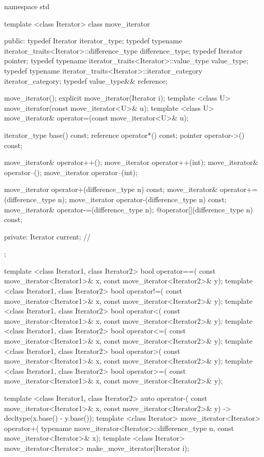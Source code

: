 %
\begin{codeblock}
namespace std {
  template <class Iterator>
  class move_iterator {
  public:
    typedef Iterator                                              iterator_type;
    typedef typename iterator_traits<Iterator>::difference_type   difference_type;
    typedef Iterator                                              pointer;
    typedef typename iterator_traits<Iterator>::value_type        value_type;
    typedef typename iterator_traits<Iterator>::iterator_category iterator_category;
    typedef value_type&&                                          reference;

    move_iterator();
    explicit move_iterator(Iterator i);
    template <class U> move_iterator(const move_iterator<U>& u);
    template <class U> move_iterator& operator=(const move_iterator<U>& u);

    iterator_type base() const;
    reference operator*() const;
    pointer operator->() const;

    move_iterator& operator++();
    move_iterator operator++(int);
    move_iterator& operator--();
    move_iterator operator--(int);

    move_iterator operator+(difference_type n) const;
    move_iterator& operator+=(difference_type n);
    move_iterator operator-(difference_type n) const;
    move_iterator& operator-=(difference_type n);
    @\unspec@ operator[](difference_type n) const;

  private:
    Iterator current;   // \expos
  };

  template <class Iterator1, class Iterator2>
    bool operator==(
      const move_iterator<Iterator1>& x, const move_iterator<Iterator2>& y);
  template <class Iterator1, class Iterator2>
    bool operator!=(
      const move_iterator<Iterator1>& x, const move_iterator<Iterator2>& y);
  template <class Iterator1, class Iterator2>
    bool operator<(
      const move_iterator<Iterator1>& x, const move_iterator<Iterator2>& y);
  template <class Iterator1, class Iterator2>
    bool operator<=(
      const move_iterator<Iterator1>& x, const move_iterator<Iterator2>& y);
  template <class Iterator1, class Iterator2>
    bool operator>(
      const move_iterator<Iterator1>& x, const move_iterator<Iterator2>& y);
  template <class Iterator1, class Iterator2>
    bool operator>=(
      const move_iterator<Iterator1>& x, const move_iterator<Iterator2>& y);

  template <class Iterator1, class Iterator2>
    auto operator-(
      const move_iterator<Iterator1>& x,
      const move_iterator<Iterator2>& y) -> decltype(x.base() - y.base());
  template <class Iterator>
    move_iterator<Iterator> operator+(
      typename move_iterator<Iterator>::difference_type n, const move_iterator<Iterator>& x);
  template <class Iterator>
    move_iterator<Iterator> make_move_iterator(Iterator i);
}
\end{codeblock}

